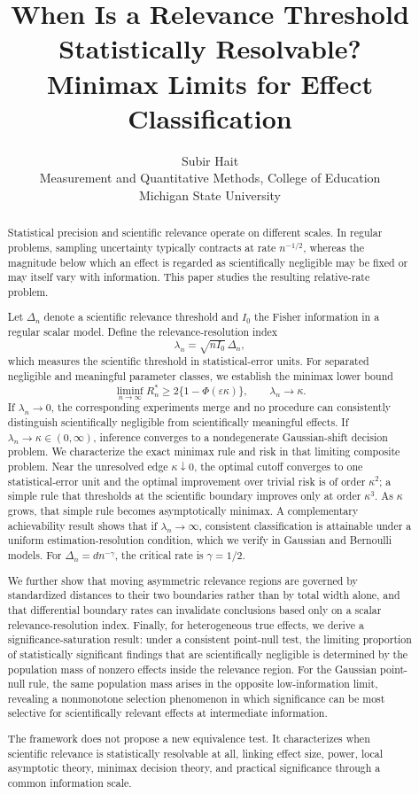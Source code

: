 \documentclass[11pt]{article}
\title{\textbf{When Is a Relevance Threshold Statistically Resolvable?}\\[6pt]
Minimax Limits for Effect Classification}
\author{Subir Hait\\
Measurement and Quantitative Methods, College of Education\\
Michigan State University}
\date{}
\theoremstyle{remark}
\begin{document}
\maketitle
\thispagestyle{empty}
\clearpage

\begin{abstract}
Statistical precision and scientific relevance operate on different scales. In regular problems, sampling uncertainty typically contracts at rate $n^{-1/2}$, whereas the magnitude below which an effect is regarded as scientifically negligible may be fixed or may itself vary with information. This paper studies the resulting relative-rate problem.

Let $\Delta_n$ denote a scientific relevance threshold and $I_0$ the Fisher information in a regular scalar model. Define the relevance-resolution index
\[
\lambda_n=\sqrt{nI_0}\,\Delta_n,
\]
which measures the scientific threshold in statistical-error units. For separated negligible and meaningful parameter classes, we establish the minimax lower bound
\[
\liminf_{n\to\infty}R_n^*\ge 2\{1-\Phi(\varepsilon\kappa)\},
\qquad \lambda_n\to\kappa.
\]
If $\lambda_n\to0$, the corresponding experiments merge and no procedure can consistently distinguish scientifically negligible from scientifically meaningful effects. If $\lambda_n\to\kappa\in(0,\infty)$, inference converges to a nondegenerate Gaussian-shift decision problem. We characterize the exact minimax rule and risk in that limiting composite problem. Near the unresolved edge $\kappa\downarrow0$, the optimal cutoff converges to one statistical-error unit and the optimal improvement over trivial risk is of order $\kappa^2$; a simple rule that thresholds at the scientific boundary improves only at order $\kappa^3$. As $\kappa$ grows, that simple rule becomes asymptotically minimax. A complementary achievability result shows that if $\lambda_n\to\infty$, consistent classification is attainable under a uniform estimation-resolution condition, which we verify in Gaussian and Bernoulli models. For $\Delta_n=d n^{-\gamma}$, the critical rate is $\gamma=1/2$.

We further show that moving asymmetric relevance regions are governed by standardized distances to their two boundaries rather than by total width alone, and that differential boundary rates can invalidate conclusions based only on a scalar relevance-resolution index. Finally, for heterogeneous true effects, we derive a significance-saturation result: under a consistent point-null test, the limiting proportion of statistically significant findings that are scientifically negligible is determined by the population mass of nonzero effects inside the relevance region. For the Gaussian point-null rule, the same population mass arises in the opposite low-information limit, revealing a nonmonotone selection phenomenon in which significance can be most selective for scientifically relevant effects at intermediate information.

The framework does not propose a new equivalence test. It characterizes when scientific relevance is statistically resolvable at all, linking effect size, power, local asymptotic theory, minimax decision theory, and practical significance through a common information scale.
\end{abstract}
\end{document}
